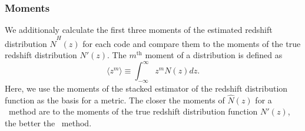 %


\subsubsection{Moments}
\label{sec:moments}

We additionaly calculate the first three moments of the estimated redshift distribution $\hat{N}^{H}(z)$ for each code and compare them to the moments of the true redshift distribution $N'(z)$.
The $m^{\mathrm{th}}$ moment of a distribution is defined as
\begin{equation}
\langle z^{m}\rangle \equiv \int_{-\infty}^{\infty}z^{m}N(z)dz .
\end{equation}
Here, we use the moments of the stacked estimator of the redshift distribution function as the basis for a metric.
The closer the moments of $\hat{N}(z)$ for a \pzpdf\ method are to the moments of the true redshift distribution function $N'(z)$, the better the \pzpdf\ method.
